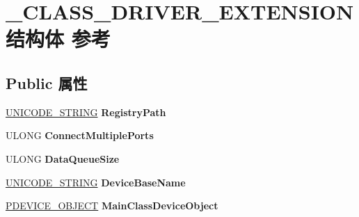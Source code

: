 \hypertarget{struct___c_l_a_s_s___d_r_i_v_e_r___e_x_t_e_n_s_i_o_n}{}\section{\+\_\+\+C\+L\+A\+S\+S\+\_\+\+D\+R\+I\+V\+E\+R\+\_\+\+E\+X\+T\+E\+N\+S\+I\+O\+N结构体 参考}
\label{struct___c_l_a_s_s___d_r_i_v_e_r___e_x_t_e_n_s_i_o_n}
\subsection*{Public 属性}
\begin{DoxyCompactItemize}
\item 
\mbox{\label{struct___c_l_a_s_s___d_r_i_v_e_r___e_x_t_e_n_s_i_o_n_ac30cb7d530c4b24231fb370ed3bae17f}} 
\hyperlink{struct___u_n_i_c_o_d_e___s_t_r_i_n_g}{U\+N\+I\+C\+O\+D\+E\+\_\+\+S\+T\+R\+I\+NG} {\bfseries Registry\+Path}
\item 
\mbox{\label{struct___c_l_a_s_s___d_r_i_v_e_r___e_x_t_e_n_s_i_o_n_a3d1455cea4acedf717c8842d4dbd48c1}} 
U\+L\+O\+NG {\bfseries Connect\+Multiple\+Ports}
\item 
\mbox{\label{struct___c_l_a_s_s___d_r_i_v_e_r___e_x_t_e_n_s_i_o_n_a6b5bc9e220c92b3b5f5b61fce6ad2353}} 
U\+L\+O\+NG {\bfseries Data\+Queue\+Size}
\item 
\mbox{\label{struct___c_l_a_s_s___d_r_i_v_e_r___e_x_t_e_n_s_i_o_n_ae85a262e058aeecafad15e06757d2f60}} 
\hyperlink{struct___u_n_i_c_o_d_e___s_t_r_i_n_g}{U\+N\+I\+C\+O\+D\+E\+\_\+\+S\+T\+R\+I\+NG} {\bfseries Device\+Base\+Name}
\item 
\mbox{\label{struct___c_l_a_s_s___d_r_i_v_e_r___e_x_t_e_n_s_i_o_n_a4ffd6c8d7c25792380afba7daca24f79}} 
\hyperlink{struct___d_e_v_i_c_e___o_b_j_e_c_t}{P\+D\+E\+V\+I\+C\+E\+\_\+\+O\+B\+J\+E\+CT} {\bfseries Main\+Class\+Device\+Object}
\item 
\mbox{\label{struct___c_l_a_s_s___d_r_i_v_e_r___e_x_t_e_n_s_i_o_n_a09ea1c6eda5b5767d7a2b7663f549dbc}} 

\end{DoxyCompactItemize}
